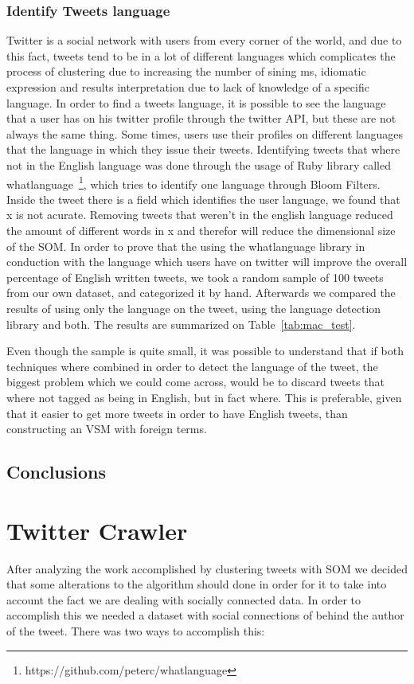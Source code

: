\subsubsection{Identify Tweets language}
\label{ssub:identify_tweets_lang}
Twitter is a social network with users from every corner of the world, and due to this fact, tweets tend to be in a lot of different languages which complicates the process of clustering due to increasing the number of sining ms, idiomatic expression and results interpretation due to lack of knowledge of a specific language.  
In order to find a tweets language, it is possible to see the language that a user has on his twitter profile through the twitter API, but these are not always the same thing. Some times, users use their profiles on different languages that the language in which they issue their tweets.
Identifying tweets that where not in the English language was done through the usage of Ruby library called whatlanguage~\footnote{https://github.com/peterc/whatlanguage}, which tries to identify one language through Bloom Filters. Inside the tweet there is a field which identifies the user language, we found that x is not acurate. Removing tweets that weren't in the english language reduced the amount of different words in x and therefor will reduce the dimensional size of the \ac{SOM}.
In order to prove that the using the whatlanguage library in conduction with the language which users have on twitter will improve the overall percentage of English written tweets, we took a random sample of 100 tweets from our own dataset, and categorized it by hand. Afterwards we compared the results of using only the language on the tweet, using the language detection library and both. The results are summarized on Table~\ref{tab:mac_test}.  


Even though the sample is quite small, it was possible to understand that if both techniques where combined in order to detect the language of the tweet, the biggest problem which we could come across, would be to discard tweets that where not tagged as being in English, but in fact where. This is preferable, given that it easier to get more tweets in order to have English tweets, than constructing an \ac{VSM} with foreign terms.

\subsection{Conclusions}
\label{sub:conclusions}

\section{Twitter Crawler}
\label{sec:twitter_crawler}
After analyzing the work accomplished by clustering tweets with \ac{SOM} we decided that some alterations to the algorithm should done in order for it to take into account the fact we are dealing with socially connected data. In order to accomplish this we needed a dataset with social connections of behind the author of the tweet. There was two ways to accomplish this: 

